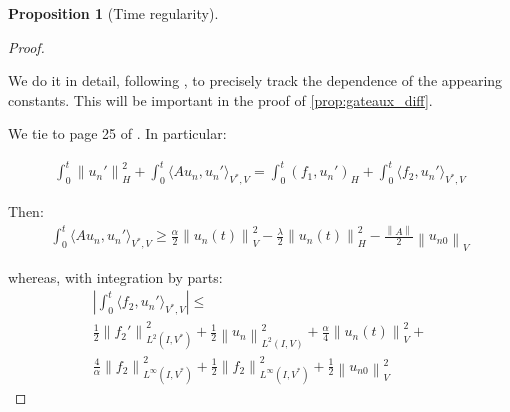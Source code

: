 \documentclass[english,a4paper,10pt,oneside]{scrbook}	%
\theoremstyle{break}
\newtheorem{prop}[equation]{Proposition}
\newenvironment{mproof}[1][\proofname]{%
  \begin{proof}[#1]$ $\par\nobreak\ignorespaces
}{%
  \end{proof}
}
\renewcommand*{\proofname}{Proof}
\theoremstyle{remark}
\newcommand{\ds}{\displaystyle}
\newcommand{\norm}[1]{\left\lVert#1\right\rVert}
\newcommand{\HN}[1]{\norm{#1}_{H}}
\newcommand{\VN}[1]{\norm{#1}_{V}}
\begin{document}
\begin{appendices}
\begin{prop}[Time regularity]
%

\end{prop}
\begin{mproof}

We do it in detail, following \cite{gilardi}, to precisely track the dependence of the appearing constants. This will be important in the proof of \cref{prop:gateaux_diff}.

%
%
%
%

We tie to page 25 of \cite{gilardi}. In particular:

\begin{align*}
\int_0^t\HN{u_n'}^2+\int_0^t\langle A u_n, u_n'\rangle_{V^*,V}=\int_0^t(f_1,u_n')_H+\int_0^t \langle f_2, u_n'\rangle_{V^*,V}
\end{align*}


Then:
\begin{align*}
\int_0^t\langle A u_n, u_n'\rangle_{V^*,V}\geq \frac{\alpha}{2}\VN{u_n(t)}^2-\frac{\lambda}{2}\HN{u_n(t)}^2-\frac{\norm{A}}{2}\VN{u_{n0}}
\end{align*}

whereas, with integration by parts:
\begin{align*}
	\left | \int_0^t \langle f_2,u_n' \rangle_{V^*,V}\right | \leq\\
	\frac{1}{2}\norm{f_2'}_{L^2(I,V^*)}^2 + \frac{1}{2}\norm{u_n}_{L^2(I,V)}^2 + \frac{\alpha}{4}\VN{u_n(t)}^2 +\\
	 \frac{4}{\alpha}\norm{f_2}_{L^\infty(I,V^*)}^2+ \frac{1}{2}\norm{f_2}_{L^\infty(I,V^*)}^2+\frac{1}{2}\VN{u_{n0}}^2
\end{align*}


\end{mproof}
\end{appendices}
\end{document}
